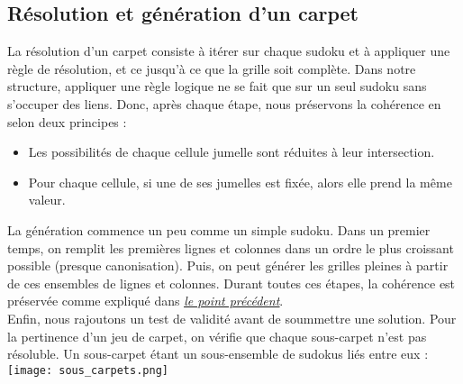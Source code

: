 \documentclass[a4paper]{article}
\begin{document}
\subsection{Résolution et génération d'un carpet}
\begin{justify}
    \qquad La résolution d'un carpet consiste à itérer sur chaque sudoku et à appliquer une règle de résolution, et ce jusqu'à ce que la grille soit complète.
    Dans notre structure, appliquer une règle logique ne se fait que sur un seul sudoku sans s'occuper des liens. Donc, après chaque étape, nous préservons la cohérence en selon deux principes :

    \begin{itemize}
        \item Les possibilités de chaque cellule jumelle sont réduites à leur intersection. 
        \item Pour chaque cellule, si une de ses jumelles est fixée, alors elle prend la même valeur.
    \end{itemize}

    \noindent La génération commence un peu comme un simple sudoku.
    Dans un premier temps, on remplit les premières lignes et colonnes dans un ordre le plus croissant possible (presque canonisation). Puis, on peut générer les grilles pleines à partir de ces ensembles de lignes et colonnes. Durant toutes ces étapes, la cohérence est préservée comme expliqué dans \hyperref[sec:link]{\uline{\textit{le point précédent}}}. \\
    
    Enfin, nous rajoutons un test de validité avant de soummettre une solution. Pour la pertinence d'un jeu de carpet, on vérifie que chaque sous-carpet n'est pas résoluble.
    Un sous-carpet étant un sous-ensemble de sudokus liés entre eux :
    \mbox{}\\[1.5em]
    \texttt{[image: sous\_carpets.png]}
    \captionsetup{hypcap=false}
\end{justify}
\end{document}
